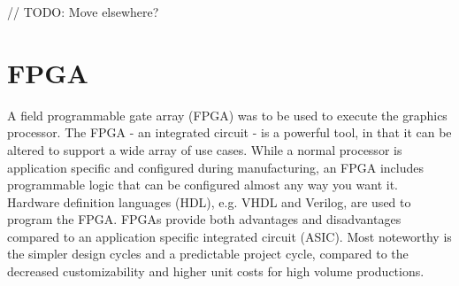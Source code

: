 // TODO: Move elsewhere?
\section{FPGA}
A field programmable gate array (FPGA) was to be used to execute the graphics processor.
The FPGA - an integrated circuit - is a powerful tool, in that it can be altered to support a wide array of use cases.
While a normal processor is application specific and configured during manufacturing, an FPGA includes programmable logic that can be configured almost any way you want it.
Hardware definition languages (HDL), e.g. VHDL and Verilog, are used to program the FPGA.
FPGAs provide both advantages and disadvantages compared to an application specific integrated circuit (ASIC).
Most noteworthy is the simpler design cycles and a predictable project cycle, compared to the decreased customizability and higher unit costs for high volume productions\cite{fpgavsasic}.

